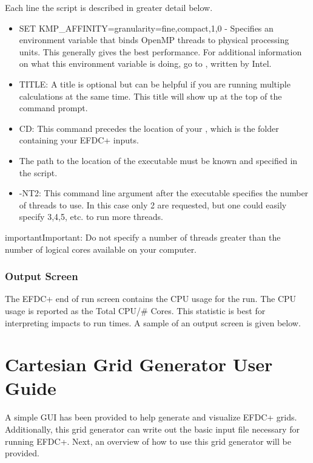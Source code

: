 \documentclass[letterpaper,10pt,english]{sphinxmanual}
\begin{document}
Each line the script is described in greater detail below.
\begin{itemize}
\item {} 
SET KMP\_AFFINITY=granularity=fine,compact,1,0 - Specifies an environment variable that binds OpenMP threads to physical processing units. This generally gives the best performance.  For additional information on what this environment variable is doing, go to , written by Intel.

\item {} 
TITLE: A title is optional but can be helpful if you are running multiple calculations at the same time.  This title will show up at the top of the command prompt.

\item {} 
CD: This command precedes the location of your , which is the folder containing your EFDC+ inputs.

\item {} 
The path to the location of the executable must be known and specified in the script.

\item {} 
-NT2: This command line argument after the executable specifies the number of threads to use.  In this case only 2 are requested, but one could easily specify 3,4,5, etc. to run more threads.

\end{itemize}

\begin{sphinxadmonition}{important}{Important:}
Do not specify a number of threads greater than the number of logical cores available on your computer.
\end{sphinxadmonition}


\subsubsection{Output Screen}
\label{\detokenize{started/running:output-screen}}
The EFDC+ end of run screen contains the CPU usage for the run.  The CPU usage is reported as the Total CPU/\# Cores. This statistic is best for interpreting impacts to run times.  A sample of an output screen is given below.



\section{Cartesian Grid Generator User Guide}
\label{\detokenize{gridgen/index:cartesian-grid-generator-user-guide}}\label{\detokenize{gridgen/index:gridgen}}\label{\detokenize{gridgen/index::doc}}
A simple GUI has been provided to help generate and visualize EFDC+ grids.  Additionally, this grid generator can write out the basic input file necessary for running EFDC+.  Next, an overview of how to use this grid generator will be provided.
\end{document}
